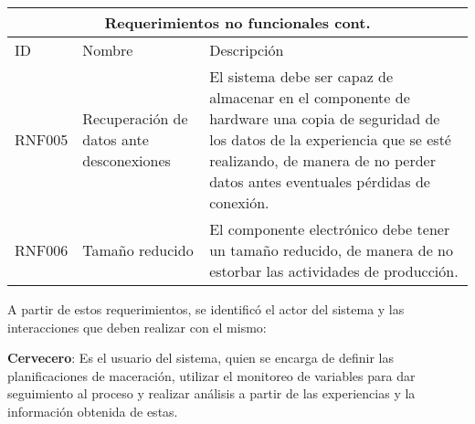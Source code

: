     \begin{table}[H]
    \begin{center}
    \begin{tabularx}{\textwidth}{| X | X | X |}
    \hline
    \multicolumn{3}{|c|}{\textbf{Requerimientos no funcionales cont.}} \\
    \hline
    ID & Nombre & Descripción \\
    \hline
    \hline          

        RNF005 & Recuperación de datos ante desconexiones & El sistema debe ser capaz de almacenar en el componente de hardware una copia de seguridad de los datos de la experiencia que se esté realizando, de manera de no perder datos antes eventuales pérdidas de conexión.
        \\ \hline
        RNF006 & Tamaño reducido & El componente electrónico debe tener un tamaño reducido, de manera de no estorbar las actividades de producción.
         \\\hline
    \end{tabularx}
    \label{ReqNoFuncionales_Parte2}
    \end{center}
    \end{table}
    
    
    \par
    A partir de estos requerimientos, se identificó el actor del sistema y las
    interacciones que deben realizar con el mismo:
    \par
    \textbf{Cervecero}: Es el usuario del sistema, quien se encarga de definir las planificaciones de maceración, utilizar el monitoreo de variables para dar seguimiento al proceso y realizar análisis a partir de las experiencias y la información obtenida de estas.
 
